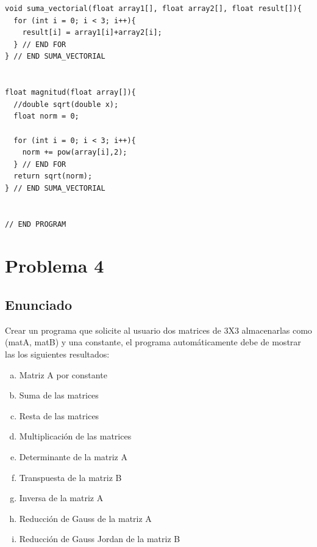 \begin{lstlisting}
void suma_vectorial(float array1[], float array2[], float result[]){
  for (int i = 0; i < 3; i++){
    result[i] = array1[i]+array2[i];
  } // END FOR
} // END SUMA_VECTORIAL


float magnitud(float array[]){
  //double sqrt(double x);
  float norm = 0;

  for (int i = 0; i < 3; i++){
    norm += pow(array[i],2);
  } // END FOR
  return sqrt(norm);
} // END SUMA_VECTORIAL


// END PROGRAM
\end{lstlisting}


\section{Problema 4}
\subsection{Enunciado}
Crear un programa que solicite al usuario dos matrices de 3X3 almacenarlas como (matA, matB) y
una constante, el programa automáticamente debe de mostrar las los siguientes resultados:
\begin{multicols}{2}
	\begin{enumerate}[a)]
		\item Matriz A por constante
		\item Suma de las matrices
		\item Resta de las matrices
		\item Multiplicación de las matrices
		\item Determinante de la matriz A
		\item Transpuesta de la matriz B
		\item Inversa de la matriz A
		\item Reducción de Gauss de la matriz A
		\item Reducción de Gauss Jordan de la matriz B
	\end{enumerate}
\end{multicols}

